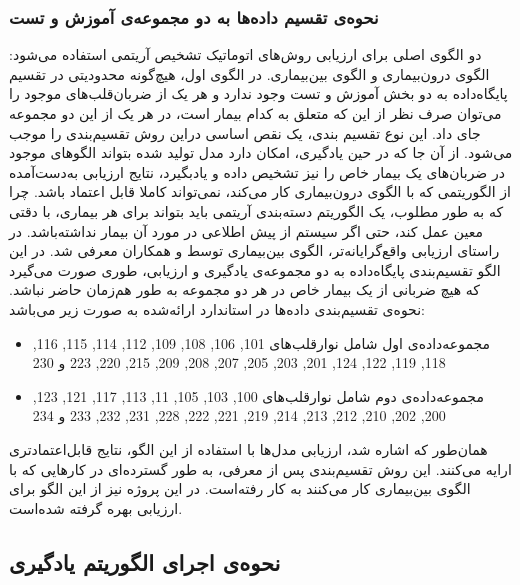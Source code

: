 		\subsubsection{نحوه‌ی تقسیم داده‌ها به دو مجموعه‌ی آموزش و تست}
		دو الگوی اصلی برای ارزیابی روش‌های اتوماتیک تشخیص آریتمی استفاده می‌شود: الگوی درون‌بیماری و الگوی بین‌بیماری. در الگوی اول، هیچ‌گونه محدودیتی در تقسیم پایگاه‌داده به دو بخش آموزش و تست وجود ندارد و هر یک از ضربان‌قلب‌های موجود را می‌توان صرف نظر از این که متعلق به کدام بیمار است، در هر یک از این دو مجموعه جای داد. این نوع تقسیم بندی، یک نقص اساسی دراین روش تقسیم‌بندی را موجب می‌شود. از آن جا که در حین یادگیری، امکان دارد مدل تولید شده بتواند الگوهای موجود در ضربان‌های یک بیمار خاص را نیز تشخیص داده و یادبگیرد، نتایج ارزیابی به‌دست‌آمده از الگوریتمی که با الگوی درون‌بیماری کار می‌کند، نمی‌تواند کاملا قابل اعتماد باشد. چرا که به طور مطلوب، یک الگوریتم دسته‌بندی آریتمی باید بتواند برای هر بیماری، با دقتی معین عمل کند، حتی اگر سیستم از پیش اطلاعی در مورد آن بیمار نداشته‌باشد. 
در راستای ارزیابی واقع‌گرایانه‌تر، الگوی بین‌بیماری توسط  و همکاران معرفی شد.\cite{deChazal2004} در این الگو تقسیم‌بندی پایگاه‌داده به دو مجموعه‌ی یادگیری و ارزیابی، طوری صورت می‌گیرد که هیچ ضربانی از یک بیمار خاص در هر دو مجموعه به طور هم‌زمان حاضر نباشد. نحوه‌ی تقسیم‌بندی داده‌ها در استاندارد ارائه‌شده به صورت زیر می‌باشد:
\begin{itemize}
	\item مجموعه‌داده‌ی اول  شامل نوارقلب‌های 101, 106, 108, 109, 112, 114, 115, 116, 118,
119, 122, 124, 201, 203, 205, 207, 208, 209, 215, 220, 223 و
230
	\item مجموعه‌داده‌ی دوم  شامل نوارقلب‌های 100, 103, 105, 11, 113, 117, 121, 123,
200, 202, 210, 212, 213, 214, 219, 221, 222, 228, 231, 232, 233
و 234
\end{itemize}
 همان‌طور که اشاره شد، ارزیابی مدل‌ها با استفاده از این الگو، نتایج قابل‌اعتمادتری ارایه می‌کنند. این روش تقسیم‌بندی پس از معرفی، به طور گسترده‌ای در کارهایی که با الگوی بین‌بیماری کار می‌کنند به کار رفته‌است. در این پروژه نیز از این الگو برای ارزیابی بهره گرفته شده‌است. 


	\subsection{نحوه‌ی اجرای الگوریتم یادگیری}
		
